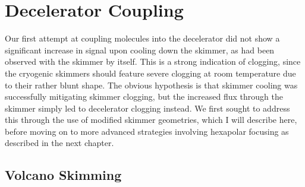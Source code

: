 
\section{Decelerator Coupling}

Our first attempt at coupling molecules into the decelerator did not show a significant increase in signal upon cooling down the skimmer, as had been observed with the skimmer by itself.
This is a strong indication of clogging, since the cryogenic skimmers should feature severe clogging at room temperature due to their rather blunt shape.
The obvious hypothesis is that skimmer cooling was successfully mitigating skimmer clogging, but the increased flux through the skimmer simply led to decelerator clogging instead.
We first sought to address this through the use of modified skimmer geometries, which I will describe here, before moving on to more advanced strategies involving hexapolar focusing as described in the next chapter.

\subsection{Volcano Skimming}



